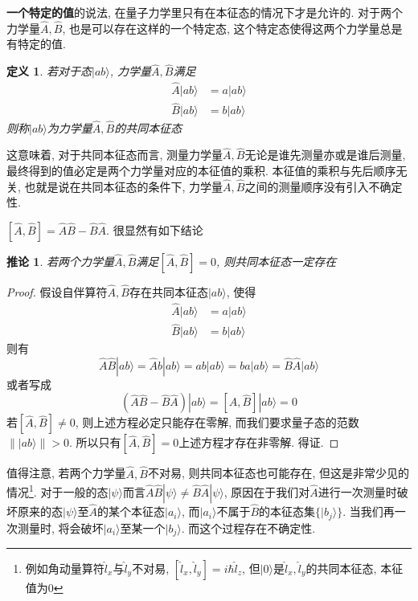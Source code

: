 \documentclass[a4paper,11pt]{book}
\newtheorem{definition}{\hspace{2em}定义}[section]
\newtheorem{proof}{证明}[section]
\newtheorem{corollary}{推论}[section]
\begin{document}
\textbf{一个特定的值}的说法, 在量子力学里只有在本征态的情况下才是允许的. 对于两个力学量$\hat{A},\hat{B}$, 也是可以存在这样的一个特定态, 这个特定态使得这两个力学量总是有特定的值.
\begin{definition}
  若对于态$|ab\rangle$, 力学量$\hat{A},\hat{B}$满足
  \begin{equation*}
    \begin{split}
       \hat{A}|ab\rangle & =a|ab\rangle \\
       \hat{B}|ab\rangle& =b|ab\rangle
    \end{split}
  \end{equation*}
  则称$|ab\rangle$为力学量$\hat{A},\hat{B}$的共同本征态
\end{definition}
这意味着, 对于共同本征态而言, 测量力学量$\hat{A},\hat{B}$无论是谁先测量亦或是谁后测量, 最终得到的值必定是两个力学量对应的本征值的乘积. 本征值的乘积与先后顺序无关, 也就是说在共同本征态的条件下, 力学量$\hat{A},\hat{B}$之间的测量顺序没有引入不确定性.

$[\hat{A},\hat{B}]=\hat{A}\hat{B}-\hat{B}\hat{A}$. 很显然有如下结论
\begin{corollary}
  若两个力学量$\hat{A},\hat{B}$满足$[\hat{A},\hat{B}]=0$, 则共同本征态一定存在
\end{corollary}
\begin{proof}
假设自伴算符$\hat{A},\hat{B}$存在共同本征态$|ab\rangle$, 使得
\begin{equation*}
  \begin{split}
     \hat{A}|ab\rangle&=a|ab\rangle\\
     \hat{B}|ab\rangle&=b|ab\rangle
  \end{split}
\end{equation*}
则有
  \begin{equation*}
  \hat{A}\hat{B}|ab\rangle=\hat{A}b|ab\rangle=ab|ab\rangle=ba|ab\rangle=\hat{B}\hat{A}|ab\rangle
\end{equation*}
或者写成
\begin{equation*}
  (\hat{A}\hat{B}-\hat{B}\hat{A})|ab\rangle=[\hat{A},\hat{B}]|ab\rangle=0
\end{equation*}
若$[\hat{A},\hat{B}]\neq0$, 则上述方程必定只能存在零解, 而我们要求量子态的范数$\||ab\rangle\|>0$. 所以只有$[\hat{A},\hat{B}]=0$上述方程才存在非零解. 得证.
\end{proof}
值得注意, 若两个力学量$\hat{A},\hat{B}$不对易, 则共同本征态也可能存在, 但这是非常少见的情况\footnote{例如角动量算符$\hat{l}_x$与$\hat{l}_y$不对易, $[\hat{l}_x,\hat{l}_y]=i\hbar\hat{l}_z$, 但$|0\rangle$是$\hat{l}_x,\hat{l}_y$的共同本征态, 本征值为$0$}. 对于一般的态$|\psi\rangle$而言$\hat{A}\hat{B}|\psi\rangle\neq\hat{B}\hat{A}|\psi\rangle$, 原因在于我们对$\hat{A}$进行一次测量时破坏原来的态$|\psi\rangle$至$\hat{A}$的某个本征态$|a_i\rangle$, 而$|a_i\rangle$不属于$\hat{B}$的本征态集$\{|b_j\rangle\}$. 当我们再一次测量时, 将会破坏$|a_i\rangle$至某一个$|b_j\rangle$. 而这个过程存在不确定性.
\end{document}

